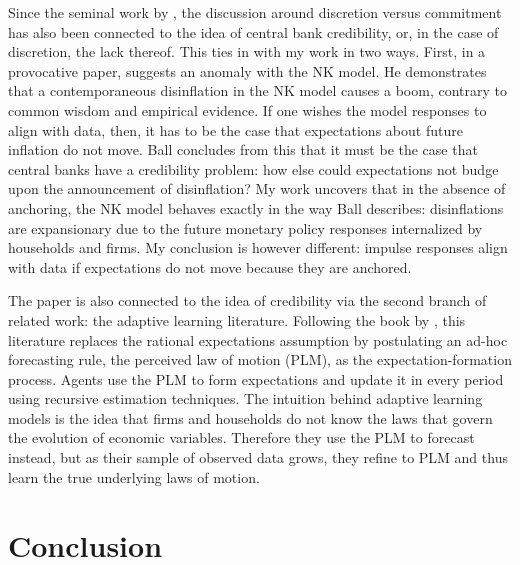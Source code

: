 \documentclass[11pt]{article}
\renewcommand{\[}{\begin{equation}}
\renewcommand{\]}{\end{equation}}
\begin{document}
Since the seminal work by \cite{barro1983rules}, the discussion around discretion versus commitment has also been connected to the idea of central bank credibility, or, in the case of discretion, the lack thereof. This ties in with my work in two ways. First, in a provocative paper, \cite{ball1994credible} suggests an anomaly with the NK model. He demonstrates that a contemporaneous disinflation in the NK model causes a boom, contrary to common wisdom and empirical evidence. If one wishes the model responses to align with data, then, it has to be the case that expectations about future inflation do not move. Ball concludes from this that it must be the case that central banks have a credibility problem: how else could expectations not budge upon the announcement of disinflation? My work uncovers that in the absence of anchoring, the NK model behaves exactly in the way Ball describes: disinflations are expansionary due to the future monetary policy responses internalized by households and firms. My conclusion is however different: impulse responses align with data if expectations do not move because they are anchored. 

The paper is also connected to the idea of credibility via the second branch of related work: the adaptive learning literature. Following the book by \cite{evans_honkapohja2001}, this literature replaces the rational expectations assumption by postulating an ad-hoc forecasting rule, the perceived law of motion (PLM), as the expectation-formation process. Agents use the PLM to form expectations and update it in every period using recursive estimation techniques. The intuition behind adaptive learning models is the idea that firms and households do not know the laws that govern the evolution of economic variables. Therefore they use the PLM to forecast instead, but as their sample of observed data grows, they refine to PLM and thus learn the true underlying laws of motion. 


\newpage
\section{Conclusion}\label{conclusion}

\newpage


\nocite{*}
\end{document}
